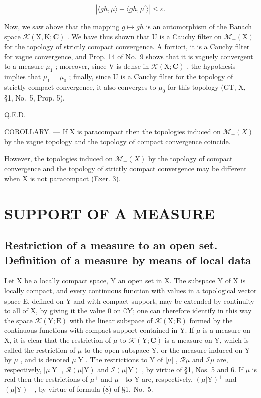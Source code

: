 \[
| \langle g h, \mu \rangle - \langle g h, \mu^ {\prime} \rangle | \leqslant \varepsilon .
\]

Now, we saw above that the mapping \(g \mapsto gh\) is an automorphism of the Banach space \(\mathcal{K}(\mathrm{X},\mathrm{K};\mathbf{C})\) . We have thus shown that U is a Cauchy filter on \(\mathcal{M}_{+}(\mathrm{X})\) for the topology of strictly compact convergence. A fortiori, it is a Cauchy filter for vague convergence, and Prop. 14 of No.~9 shows that it is vaguely convergent to a measure \(\mu_{1}\) ; moreover, since V is dense in \(\mathcal{K}(\mathrm{X};\mathbf{C})\) , the hypothesis implies that \(\mu_{1} = \mu_{0}\) ; finally, since U is a Cauchy filter for the topology of strictly compact convergence, it also converges to \(\mu_{0}\) for this topology (GT, X, §1, No.~5, Prop. 5).

Q.E.D.

COROLLARY. --- If X is paracompact then the topologies induced on \(\mathcal{M}_{+}(X)\) by the vague topology and the topology of compact convergence coincide.

However, the topologies induced on \(\mathcal{M}_{+}(X)\) by the topology of compact convergence and the topology of strictly compact convergence may be different when X is not paracompact (Exer. 3).

\section{SUPPORT OF A MEASURE}

\subsection{Restriction of a measure to an open set. Definition of a measure by means of local data}

Let X be a locally compact space, Y an open set in X. The subspace Y of X is locally compact, and every continuous function with values in a topological vector space E, defined on Y and with compact support, may be extended by continuity to all of X, by giving it the value 0 on \(\complement \mathrm{Y}\); one can therefore identify in this way the space \(\mathcal{K}(\mathrm{Y};\mathrm{E})\) with the linear subspace of \(\mathcal{K}(\mathrm{X};\mathrm{E})\) formed by the continuous functions with compact support contained in Y. If \(\mu\) is a measure on X, it is clear that the restriction of \(\mu\) to \(\mathcal{K}(\mathrm{Y};\mathbf{C})\) is a measure on Y, which is called the restriction of \(\mu\) to the open subspace Y, or the measure induced on Y by \(\mu\) , and is denoted \(\mu|\mathrm{Y}\) . The restrictions to Y of \(|\mu|\) , \(\mathcal{R}\mu\) and \(\mathcal{I}\mu\) are, respectively, \(|\mu|\mathrm{Y}|\) , \(\mathcal{R}(\mu|\mathrm{Y})\) and \(\mathcal{I}(\mu|\mathrm{Y})\) , by virtue of §1, Nos. 5 and 6. If \(\mu\) is real then the restrictions of \(\mu^{+}\) and \(\mu^{-}\) to Y are, respectively, \((\mu|\mathrm{Y})^{+}\) and \((\mu|\mathrm{Y})^{-}\) , by virtue of formula (8) of §1, No.~5.

